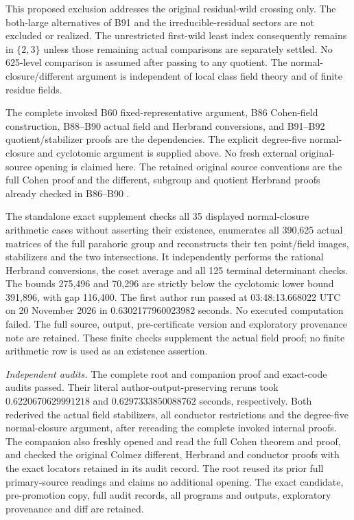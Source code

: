 \begin{remark}
\label{rem:B-RD93-scope}
This proposed exclusion addresses the original residual-wild
crossing only. The both-large alternatives of B91 and the
irreducible-residual sectors are not excluded or realized.
The unrestricted first-wild least index consequently remains
in \(\{2,3\}\) unless those remaining actual comparisons are
separately settled. No 625-level comparison is assumed after
passing to any quotient. The normal-closure/different argument
is independent of local class field theory and of finite
residue fields.

The complete invoked B60 fixed-representative argument,
B86 Cohen-field construction, B88--B90 actual field and
Herbrand conversions, and B91--B92 quotient/stabilizer proofs
are the dependencies. The explicit degree-five normal-closure
and cyclotomic argument is supplied above. No fresh external
original-source opening is claimed here. The retained original
source conventions are the full Cohen proof and the different,
subgroup and quotient Herbrand proofs already checked in B86--B90
\cite{Stacks032A,ColmezCorpsLocaux}.

The standalone exact supplement
checks all 35 displayed normal-closure arithmetic cases without
asserting their existence, enumerates all 390,625 actual matrices
of the full parahoric group and reconstructs their ten point/field
images, stabilizers and the two intersections. It independently
performs the rational Herbrand conversions, the coset average and
all 125 terminal determinant checks. The bounds 275,496 and
70,296 are strictly below the cyclotomic lower bound 391,896,
with gap 116,400. The first author run passed at
03:48:13.668022 UTC on 20 November 2026 in
0.6302177960023982 seconds. No executed computation failed.
The full source, output, pre-certificate version and exploratory
provenance note are retained. These finite checks supplement the
actual field proof; no finite arithmetic row is used as an
existence assertion.

\smallskip
\noindent\emph{Independent audits.}
The complete root and companion proof and exact-code audits passed.
Their literal author-output-preserving reruns took
\(0.6220670629991218\) and
\(0.6297333850088762\) seconds, respectively.
Both rederived the actual field stabilizers, all conductor restrictions
and the degree-five normal-closure argument, after rereading the
complete invoked internal proofs. The companion also freshly opened
and read the full Cohen theorem and proof, and checked the original
Colmez different, Herbrand and conductor proofs with the exact
locators retained in its audit record. The root reused its prior
full primary-source readings and claims no additional opening.
The exact candidate, pre-promotion copy, full audit records, all
programs and outputs, exploratory provenance and diff are retained.
\end{remark}
